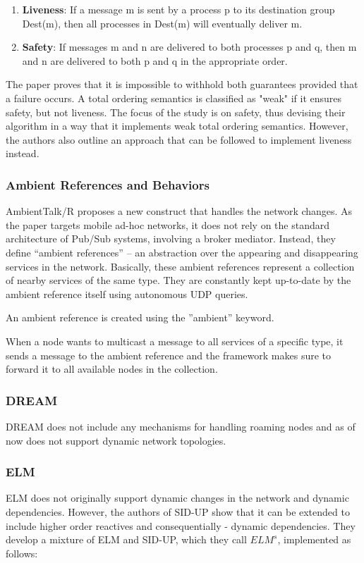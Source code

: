 \documentclass{sigplanconf}
\begin{document}
\begin{enumerate}
  \item \textbf{Liveness}: If a message m is sent by a process p to its destination group Dest(m), then all processes in Dest(m) will eventually deliver m.
  \item \textbf{Safety}: If messages m and n are delivered to both processes p and q, then m and n are delivered to both p and q in the appropriate order.
\end{enumerate}

The paper proves that it is impossible to withhold both guarantees provided that a failure occurs. A total ordering semantics is classified as "weak" if it ensures safety, but not liveness. The focus of the study is on safety, thus devising their algorithm in a way that it implements weak total ordering semantics. However, the authors also outline an approach that can be followed to implement liveness instead.

\subsubsection{Ambient References and Behaviors}
AmbientTalk/R proposes a new construct that handles the network changes. As the paper targets mobile ad-hoc networks, it does not rely on the standard architecture of Pub/Sub systems, involving a broker mediator. Instead, they define “ambient references” -- an abstraction over the appearing and disappearing services in the network. Basically, these ambient references represent a collection of nearby services of the same type. They are constantly kept up-to-date by the ambient reference itself using autonomous UDP queries.

An ambient reference is created using the ''ambient'' keyword.

When a node wants to multicast a message to all services of a specific type, it sends a message to the ambient reference and the framework makes sure to forward it to all available nodes in the collection.

\subsubsection{DREAM}
DREAM \cite{dream} does not include any mechanisms for handling roaming nodes and as of now does not support dynamic network topologies.

\subsubsection{ELM}
ELM does not originally support dynamic changes in the network and dynamic dependencies. However, the authors of SID-UP \cite{sidup} show that it can be extended to include higher order reactives and consequentially - dynamic dependencies. They develop a mixture of ELM and SID-UP, which they call $ELM^s$, implemented as follows:
\end{document}
